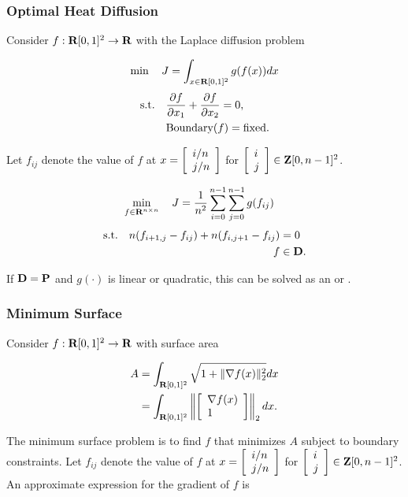 \documentclass{article}
\begin{document}
    \subsubsection{Optimal Heat Diffusion}
    Consider $f:\textbf{R}[0,1]^2\to\textbf{R}$ with the Laplace diffusion problem

    \begin{align*}
        \min\quad J = \int_{ x\in\textbf{R}[0,1]^2  } g(f(x)) dx
    \end{align*}
    \begin{align*}
        \text{s.t.}\quad &\frac{\partial f}{\partial x_1}+\frac{\partial f}{\partial x_2}=0,\\
        &\text{Boundary}(f) = \text{fixed}.
    \end{align*}

    Let $f_{ij}$ denote the value of $f$ at  $x=\left[\begin{array}{lllllllllllllllllll}i/n \\ j/n\end{array}\right]$ 
    for $\left[\begin{array}{lllllllllllllllllll}i\\j\end{array}\right]\in\textbf{Z}[0,n-1]^2$.

    \begin{align*}
        \min_{f\in\textbf{R}^{n\times n}}\quad J&=\frac{1}{n^2}\sum_{i=0}^{n-1}\sum_{j=0}^{n-1} g(f_{ij})
    \end{align*}
    \begin{align*}
        \text{s.t.}\quad n(f_{i+1,j}-f_{ij})+n(f_{i,j+1}-f_{ij})&=0\\
        f&\in\textbf{D}.
    \end{align*}

    If $\textbf{D}=\textbf{P}$ and $g(\cdot)$ is linear or quadratic, this can be solved as an \LP or \QP.    

    \subsubsection{Minimum Surface}
    Consider $f:\textbf{R}[0,1]^2\to\textbf{R}$ with surface area \cite[p.~159]{bv_cvxbook}

    \begin{align*}
        A&=\int_{\textbf{R}[0,1]^2}\sqrt{1+\|\nabla f(x)\|_2^2}dx\\
        &=\int_{\textbf{R}[0,1]^2}\left\|\left[\begin{array}{lllllllllllllllllll}\nabla f(x)\\1\end{array}\right]\right\|_2dx.
    \end{align*}

    The minimum surface problem is to find $f$ that minimizes $A$ subject to boundary constraints.
    Let $f_{ij}$ denote the value of $f$ at  $x=\left[\begin{array}{lllllllllllllllllll}i/n \\ j/n\end{array}\right]$ 
    for $\left[\begin{array}{lllllllllllllllllll}i\\j\end{array}\right]\in\textbf{Z}[0,n-1]^2$.  An approximate expression for the gradient of $f$ is 
\end{document}
